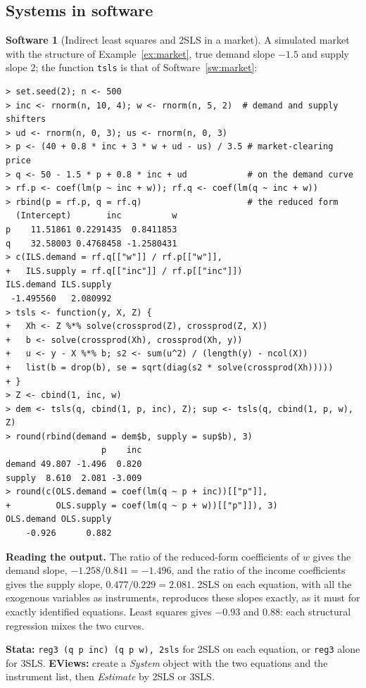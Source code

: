 \documentclass[11pt,a4paper]{article}
\numberwithin{equation}{section}
\theoremstyle{definition}
\newtheorem{software}[thm]{Software}
\begin{document}
\subsection{Systems in software}
\label{ssec:software14}

\begin{software}[Indirect least squares and 2SLS in a market]
\label{sw:ils}
A simulated market with the structure of Example~\ref{ex:market}, true demand slope $-1.5$ and supply slope $2$; the function \texttt{tsls} is that of Software~\ref{sw:market}:
{\small\begin{verbatim}
> set.seed(2); n <- 500
> inc <- rnorm(n, 10, 4); w <- rnorm(n, 5, 2)  # demand and supply shifters
> ud <- rnorm(n, 0, 3); us <- rnorm(n, 0, 3)
> p <- (40 + 0.8 * inc + 3 * w + ud - us) / 3.5 # market-clearing price
> q <- 50 - 1.5 * p + 0.8 * inc + ud            # on the demand curve
> rf.p <- coef(lm(p ~ inc + w)); rf.q <- coef(lm(q ~ inc + w))
> rbind(p = rf.p, q = rf.q)                     # the reduced form
  (Intercept)       inc          w
p    11.51861 0.2291435  0.8411853
q    32.58003 0.4768458 -1.2580431
> c(ILS.demand = rf.q[["w"]] / rf.p[["w"]],
+   ILS.supply = rf.q[["inc"]] / rf.p[["inc"]])
ILS.demand ILS.supply 
 -1.495560   2.080992 
> tsls <- function(y, X, Z) {
+   Xh <- Z %*% solve(crossprod(Z), crossprod(Z, X))
+   b <- solve(crossprod(Xh), crossprod(Xh, y))
+   u <- y - X %*% b; s2 <- sum(u^2) / (length(y) - ncol(X))
+   list(b = drop(b), se = sqrt(diag(s2 * solve(crossprod(Xh)))))
+ }
> Z <- cbind(1, inc, w)
> dem <- tsls(q, cbind(1, p, inc), Z); sup <- tsls(q, cbind(1, p, w), Z)
> round(rbind(demand = dem$b, supply = sup$b), 3)
                   p    inc
demand 49.807 -1.496  0.820
supply  8.610  2.081 -3.009
> round(c(OLS.demand = coef(lm(q ~ p + inc))[["p"]],
+         OLS.supply = coef(lm(q ~ p + w))[["p"]]), 3)
OLS.demand OLS.supply 
    -0.926      0.882 
\end{verbatim}}
\textbf{Reading the output.} The ratio of the reduced-form coefficients of $w$ gives the demand slope, $-1.258/0.841 = -1.496$, and the ratio of the income coefficients gives the
supply slope, $0.477/0.229 = 2.081$. 2SLS on each equation, with all the exogenous variables as instruments, reproduces these slopes exactly, as it must for
exactly identified equations. Least squares gives $-0.93$ and $0.88$: each structural regression mixes the two curves.

\textbf{Stata:} \texttt{reg3 (q p inc) (q p w), 2sls} for 2SLS on each equation, or \texttt{reg3} alone for 3SLS. \textbf{EViews:} create a \emph{System} object
with the two equations and the instrument list, then \emph{Estimate} by 2SLS or 3SLS.
\end{software}
\end{document}
